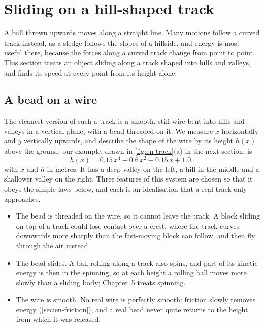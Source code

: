 \section{Sliding on a hill-shaped track}
\label{sec:en-track}

A ball thrown upwards moves along a straight line. Many motions follow a
curved track instead, as a sledge follows the slopes of a hillside, and
energy is most useful there, because the forces along a curved track
change from point to point. This section treats an object sliding along a
track shaped into hills and valleys, and finds its speed at every point
from its height alone.

\subsection*{A bead on a wire}

The cleanest version of such a track is a smooth, stiff wire bent into
hills and valleys in a vertical plane, with a bead threaded on it. We
measure $x$ horizontally and $y$ vertically upwards, and describe the
shape of the wire by its height $h(x)$ above the ground; our example,
drawn in \cref{fig:en-track}(a) in the next section, is
\begin{equation}
   h(x) = 0.15\,x^4 - 0.6\,x^2 + 0.15\,x + 1.0 ,
   \label{eq:en-track}
\end{equation}
with $x$ and $h$ in metres. It has a deep valley on the left, a hill in
the middle and a shallower valley on the right. Three features of this
system are chosen so that it obeys the simple laws below, and each is an
idealisation that a real track only approaches.
\begin{itemize}
\item The bead is threaded on the wire, so it cannot leave the track. A
   block sliding on top of a track could lose contact over a crest, where
   the track curves downwards more sharply than the fast-moving block can
   follow, and then fly through the air instead.
\item The bead slides. A ball rolling along a track also spins, and part
   of its kinetic energy is then in the spinning, so at each height a
   rolling ball moves more slowly than a sliding body; Chapter~5 treats
   spinning.
\item The wire is smooth. No real wire is perfectly smooth: friction
   slowly removes energy (\cref{sec:en-friction}), and a real bead never
   quite returns to the height from which it was released.
\end{itemize}

